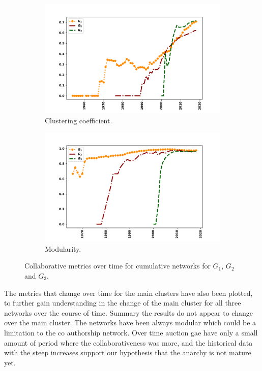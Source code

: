 \documentclass{article}
\theoremstyle{definition}
\begin{document}
\begin{figure}[!hbtp]
    \begin{subfigure}{.45\textwidth}\centering
        \includegraphics[width=1.1\textwidth]{./assets/images/clustering_coeff_over_time.pdf}
        \caption{Clustering coefficient.}\label{fig:clustering_coefficient}
     \end{subfigure}
     \begin{subfigure}{.45\textwidth}\centering
        \includegraphics[width=1.1\textwidth]{./assets/images/modularity_over_time.pdf}
        \caption{Modularity.}\label{fig:modularity}
     \end{subfigure}
    \caption{Collaborative metrics over time for cumulative networks for \(G_1\),
    \(G_2\) and \(G_3\).}\label{fig:cumulative_networks}
\end{figure}

The metrics that change over time for the main clusters have also been plotted,
to further gain understanding in the change of the main cluster for all three networks
over the course of time.
Summary the results do not appear to change over the main cluster. The networks
have been always modular which could be a limitation to the co authorship
network. Over time auction gae have only a small amount of period where the
collaborativeness was more, and the historical data with the steep increases support
our hypothesis that the anarchy is not mature yet.
\end{document}
